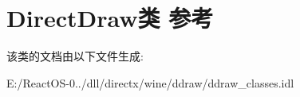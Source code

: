 \hypertarget{class_direct_draw}{}\section{Direct\+Draw类 参考}
\label{class_direct_draw}


该类的文档由以下文件生成\+:\begin{DoxyCompactItemize}
\item 
E\+:/\+React\+O\+S-\/0../dll/directx/wine/ddraw/ddraw\+\_\+classes.\+idl\end{DoxyCompactItemize}
